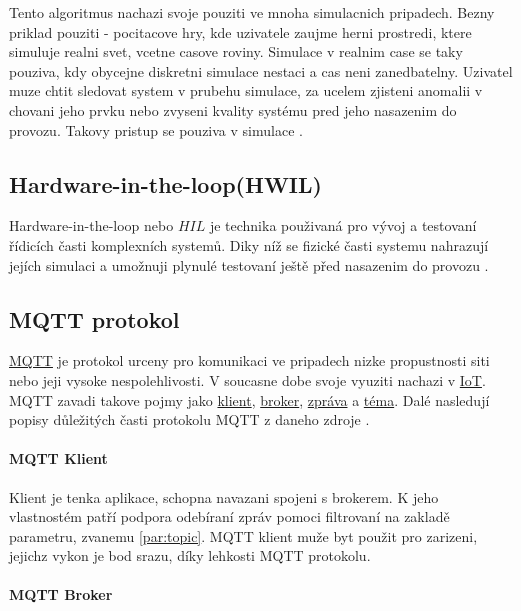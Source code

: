 Tento algoritmus nachazi svoje pouziti ve mnoha simulacnich pripadech. Bezny priklad pouziti - pocitacove hry, kde uzivatele zaujme herni prostredi, ktere simuluje realni svet, vcetne casove roviny. Simulace v realnim case se taky pouziva, kdy obycejne diskretni simulace nestaci a cas neni zanedbatelny. Uzivatel muze chtit sledovat system v prubehu simulace, za ucelem zjisteni anomalii v chovani jeho prvku nebo zvyseni kvality systému pred jeho nasazenim do provozu. Takovy pristup se pouziva v simulace \hyperref[subsec:hwil]{}.

\subsection{Hardware-in-the-loop(HWIL)}
\label{subsec:hwil}

Hardware-in-the-loop nebo $HIL$ je technika použivaná pro vývoj a testovaní řídicích časti komplexních systemů. Diky níž se fizické časti systemu nahrazují jejích simulaci a umožnuji plynulé testovaní ještě před nasazenim do provozu \cite{hil}.

\subsection{MQTT protokol}
\label{subsec:mqtt-proto}

\href{http://mqtt.org/}{MQTT} je protokol urceny pro komunikaci ve pripadech nizke propustnosti siti nebo jeji vysoke nespolehlivosti. V soucasne dobe svoje vyuziti nachazi v \href{https://en.wikipedia.org/wiki/Internet_of_things}{IoT}. MQTT zavadi takove pojmy jako \href{par:client}{klient}, \href{par:broker}{broker}, \href{par:message}{zpráva} a \href{par:topic}{téma}. Dalé nasledují popisy důležitých časti protokolu MQTT z daneho zdroje \cite{mqtt}.

\paragraph{MQTT Klient}
\label{par:client}

Klient je tenka aplikace, schopna navazani spojeni s brokerem. K jeho vlastnostém patří podpora odebíraní zpráv pomoci filtrovaní na zakladě parametru, zvanemu  \ref{par:topic}. MQTT klient muže byt použit pro zarizeni, jejichz vykon je bod srazu, díky lehkosti MQTT protokolu.

\paragraph{MQTT Broker}
\label{par:broker}

